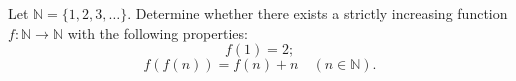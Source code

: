 Let $\mathbb{N} = \{1, 2, 3, \ldots\}$. Determine whether there exists a strictly increasing function $f : \mathbb{N} \to \mathbb{N}$ with the following properties:
\[ f(1) = 2; \tag{1} \]
\[ f(f(n)) = f(n) + n \quad (n \in \mathbb{N}). \tag{2} \]
